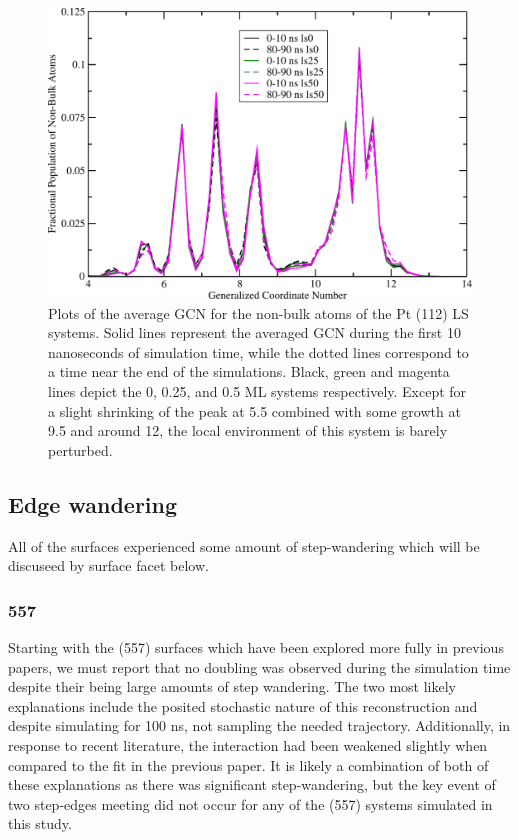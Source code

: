 \begin{figure}
  \includegraphics[width=\linewidth]{../figures/chap4/112ls_GCNF.pdf}
  \caption{Plots of the average GCN for the non-bulk atoms of the Pt (112) LS
systems. Solid lines represent the averaged GCN during the first 10 nanoseconds
of simulation time, while the dotted lines correspond to a time near the end of
the simulations. Black, green and magenta lines depict the 0, 0.25, and 0.5 ML
systems respectively. Except for a slight shrinking of the peak at 5.5 combined
with some growth at 9.5 and around 12, the local environment of this system is
barely perturbed.}
\label{fig:LS112GCNF}
\end{figure}

\subsection{Edge wandering}
All of the surfaces experienced some amount of step-wandering which will be
discuseed by surface facet below.

\subsubsection{557}
Starting with the (557) surfaces which have been explored more fully in
previous papers,\citep{Tao:2010aa, Michalka:2013aa} we must  report
that no doubling was observed during the simulation time despite their being
large amounts of step wandering. The two most likely explanations include the
posited stochastic nature of this reconstruction and despite simulating for
100 ns, not sampling the needed trajectory. Additionally, in response to
recent literature\citep{Deshlahra:2012aa}, the  interaction had
been weakened slightly when compared to the fit in the previous
paper.\citep{Michalka:2013aa} It is likely a combination of both of these
explanations as there was significant step-wandering, but the key event of two
step-edges meeting did not occur for any of the (557) systems simulated in this
study.

